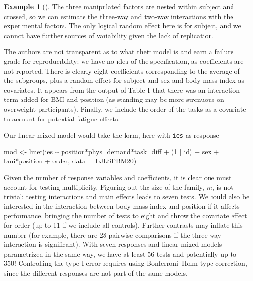 \documentclass[
  11pt,
  letterpaper,
]{scrbook}
\newenvironment{Shaded}{\begin{snugshade}}{\end{snugshade}}
\newcommand{\AttributeTok}[1]{\textcolor[rgb]{0.40,0.45,0.13}{#1}}
\newcommand{\DecValTok}[1]{\textcolor[rgb]{0.68,0.00,0.00}{#1}}
\newcommand{\FunctionTok}[1]{\textcolor[rgb]{0.28,0.35,0.67}{#1}}
\newcommand{\NormalTok}[1]{\textcolor[rgb]{0.00,0.23,0.31}{#1}}
\newcommand{\OtherTok}[1]{\textcolor[rgb]{0.00,0.23,0.31}{#1}}
\newcommand{\SpecialCharTok}[1]{\textcolor[rgb]{0.37,0.37,0.37}{#1}}
\theoremstyle{definition}
\newtheorem{example}{Example}[chapter]
\theoremstyle{definition}
\theoremstyle{remark}
\begin{document}
\begin{example}[]
The three manipulated factors are nested within subject and crossed, so
we can estimate the three-way and two-way interactions with the
experimental factors. The only logical random effect here is for
subject, and we cannot have further sources of variability given the
lack of replication.

The authors are not transparent as to what their model is and earn a
failure grade for reproducibility: we have no idea of the specification,
as coefficients are not reported. There is clearly eight coefficients
corresponding to the average of the subgroups, plus a random effect for
subject and sex and body mass index as covariates. It appears from the
output of Table 1 that there was an interaction term added for BMI and
position (as standing may be more strenuous on overweight participants).
Finally, we include the order of the tasks as a covariate to account for
potential fatigue effects.

Our linear mixed model would take the form, here with \texttt{ies} as
response

\begin{Shaded}
\begin{Highlighting}[]
\NormalTok{mod }\OtherTok{\textless{}{-}} \FunctionTok{lmer}\NormalTok{(ies }\SpecialCharTok{\textasciitilde{}}\NormalTok{ position}\SpecialCharTok{*}\NormalTok{phys\_demand}\SpecialCharTok{*}\NormalTok{task\_diff }\SpecialCharTok{+}
\NormalTok{  (}\DecValTok{1} \SpecialCharTok{|}\NormalTok{ id) }\SpecialCharTok{+}\NormalTok{ sex }\SpecialCharTok{+}\NormalTok{ bmi}\SpecialCharTok{*}\NormalTok{position }\SpecialCharTok{+}\NormalTok{ order, }
           \AttributeTok{data =}\NormalTok{ LJLSFBM20) }
\end{Highlighting}
\end{Shaded}

Given the number of response variables and coefficients, it is clear one
must account for testing multiplicity. Figuring out the size of the
family, \(m\), is not trivial: testing interactions and main effects
leads to seven tests. We could also be interested in the interaction
between body mass index and position if it affects performance, bringing
the number of tests to eight and throw the covariate effect for order
(up to 11 if we include all controls). Further contrasts may inflate
this number (for example, there are 28 pairwise comparisons if the
three-way interaction is significant). With seven responses and linear
mixed models parametrized in the same way, we have at least 56 tests and
potentially up to 350! Controlling the type-I error requires using
Bonferroni--Holm type correction, since the different responses are not
part of the same models.


\end{example}
\end{document}

